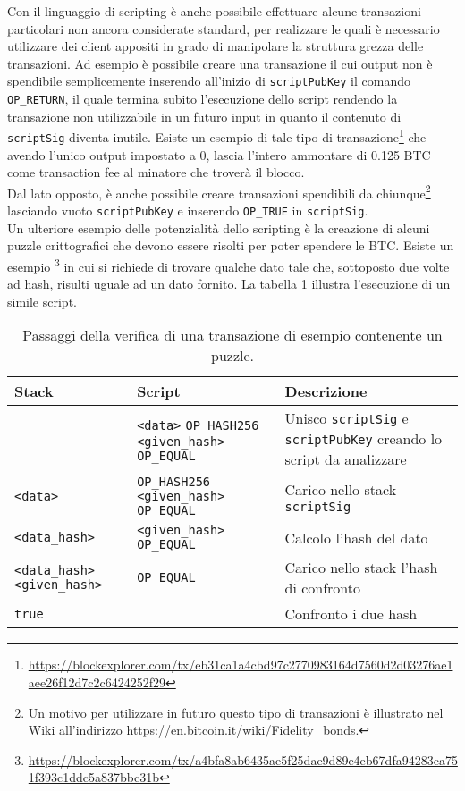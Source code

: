 Con il linguaggio di scripting è anche possibile effettuare alcune transazioni particolari non ancora considerate standard, per realizzare le quali è necessario utilizzare dei client appositi in grado di manipolare la struttura grezza delle transazioni. Ad esempio è possibile creare una transazione il cui output non è spendibile semplicemente inserendo all'inizio di \verb|scriptPubKey| il comando \verb|OP_RETURN|, il quale termina subito l'esecuzione dello script rendendo la transazione non utilizzabile in un futuro input in quanto il contenuto di \verb|scriptSig| diventa inutile. Esiste un esempio di tale tipo di transazione\footnote{\url{https://blockexplorer.com/tx/eb31ca1a4cbd97c2770983164d7560d2d03276ae1aee26f12d7c2c6424252f29}} che avendo l'unico output impostato a 0, lascia l'intero ammontare di 0.125 BTC come transaction fee al minatore che troverà il blocco.\\
Dal lato opposto, è anche possibile creare transazioni spendibili da chiunque\footnote{Un motivo per utilizzare in futuro questo tipo di transazioni è illustrato nel Wiki all'indirizzo \url{https://en.bitcoin.it/wiki/Fidelity_bonds}.} lasciando vuoto \verb|scriptPubKey| e inserendo \verb|OP_TRUE| in \verb|scriptSig|.\\
Un ulteriore esempio delle potenzialità dello scripting è la creazione di alcuni puzzle crittografici che devono essere risolti per poter spendere le BTC. Esiste un esempio \footnote{\url{https://blockexplorer.com/tx/a4bfa8ab6435ae5f25dae9d89e4eb67dfa94283ca751f393c1ddc5a837bbc31b}} in cui si richiede di trovare qualche dato tale che, sottoposto due volte ad hash, risulti uguale ad un dato fornito. La tabella \ref{table:puzzle-transaction} illustra l'esecuzione di un simile script.

\begin{table}
  \centering
  \begin{tabular}{m{} | m{} | m{}}
    \hline
    \textbf{Stack}&\textbf{Script}&\textbf{Descrizione} \\
    \hline
    \verb||&\verb|<data>| \verb|OP_HASH256| \verb|<given_hash>| \verb|OP_EQUAL|&Unisco \verb|scriptSig| e \verb|scriptPubKey| creando lo script da analizzare  \\ \hline
    \verb|<data>|&\verb|OP_HASH256| \verb|<given_hash>| \verb|OP_EQUAL|&Carico nello stack \verb|scriptSig| \\ \hline
    \verb|<data_hash>|&\verb|<given_hash>| \verb|OP_EQUAL|&Calcolo l'hash del dato \\ \hline
    \verb|<data_hash>| \verb|<given_hash>|&\verb|OP_EQUAL|&Carico nello stack l'hash di confronto \\ \hline
    \verb|true|&\verb||&Confronto i due hash \\ \hline
  \end{tabular}
  \caption[Verifica di transazione con puzzle]{Passaggi della verifica di una transazione di esempio contenente un puzzle.\label{table:puzzle-transaction}}
\end{table}


